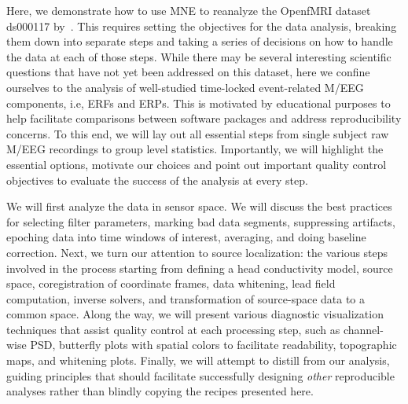 Here, we demonstrate how to use MNE to reanalyze the OpenfMRI dataset ds000117 by~\cite{wakeman2015multi}. This requires setting the objectives for the data analysis, breaking them down into separate steps and taking a series of decisions on how to handle the data at each of those steps. While there may be several interesting scientific questions that have not yet been addressed on this dataset, here we confine ourselves to the analysis of well-studied time-locked event-related M/EEG components, i.e, \acp{ERF} and \acp{ERP}. This is motivated by educational purposes to help facilitate comparisons between software packages and address reproducibility concerns. To this end, we will lay out all essential steps from single subject raw M/EEG recordings to group level statistics. Importantly, we will highlight the essential options, motivate our choices and point out important quality control objectives to evaluate the success of the analysis at every step.

We will first analyze the data in sensor space. We will discuss the best practices for selecting filter parameters, marking bad data segments, suppressing artifacts, epoching data into time windows of interest, averaging, and doing baseline correction. Next, we turn our attention to source localization: the various steps involved in the process starting from defining a head conductivity model, source space, coregistration of coordinate frames, data whitening, lead field computation, inverse solvers, and transformation of source-space data to a common space. Along the way, we will present various diagnostic visualization techniques that assist quality control at each processing step, such as channel-wise \ac{PSD}, butterfly plots with spatial colors to facilitate readability, topographic maps, and whitening plots. Finally, we will attempt to distill from our analysis, guiding principles that should facilitate successfully designing \textit{other} reproducible analyses rather than blindly copying the recipes presented here. 

